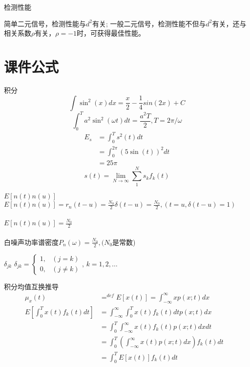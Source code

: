 \begin{frame}{检测性能}
\begin{block}{}
	简单二元信号，检测性能与$d^2$有关; 一般二元信号，检测性能不但与$d^2$有关，还与相关系数$\rho$有关，$\rho=-1$时，可获得最佳性能。
\end{block}
\end{frame}

\section{课件公式}

\begin{frame}{积分}
\[\int \sin^2(x)dx=\frac{x}{2}-\frac{1}{4}sin(2x)+C\]
\[\int_{0}^{T}a^2\sin^2(\omega t)dt=\frac{a^2T}{2}, T=2\pi/\omega\]
\begin{align*}
E_s&=\int_{0}^{T}s^2(t)dt\\
&=\int_{0}^{2\pi}(5\sin(t))^2dt\\
&=25\pi
\end{align*}
\[s(t)=\lim\limits_{N\to \infty}\sum_{1}^{N}s_kf_k(t)\]
\end{frame}

\begin{frame}{$E[n(t)n(u)]$}
$E[n(t)n(u)]=r_n(t-u)=\frac{N_0}{2}\delta(t-u)=\frac{N_0}{2},(t=u,\delta(t-u)=1)$\\
~\\
$E[n(t)n(u)]=\frac{N_0}{2}$\\
~\\
白噪声功率谱密度$P_n(\omega)=\frac{N_0}{2},(N_0$是常数)
\end{frame}

\begin{frame}{$\delta_{jk}$}
$\delta_{jk}=
\begin{cases}
1, & (j=k)\\
0, & (j\ne k)
\end{cases}
$, $k=1,2,\dots$
\end{frame}

\begin{frame}{积分均值互换推导}
\begin{align*}
\mu_x(t)&\mathop{=}^{def}E[x(t)]=\int_{-\infty}^{\infty}xp(x;t)dx&\\
E[\int_{0}^{T}x(t)f_k(t)dt]&=\int_{-\infty}^{\infty}\int_{0}^{T}x(t)f_k(t)dtp(x;t)dx\\
&=\int_{0}^{T}\int_{-\infty}^{\infty}x(t)f_k(t)p(x;t)dxdt\\
&=\int_{0}^{T}\left(\int_{-\infty}^{\infty}x(t)p(x;t)dx\right)f_k(t)dt\\
&=\int_{0}^{T}E[x(t)]f_k(t)dt
\end{align*}
\end{frame}

